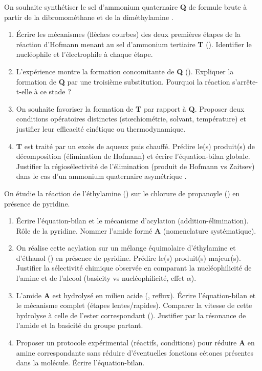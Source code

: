 \documentclass[11pt]{article}
\begin{document}
\begin{exercice}
On souhaite synthétiser le sel d'ammonium quaternaire \textbf{Q} de formule brute  à partir de la dibromométhane  et de la diméthylamine .
\begin{enumerate}
    \item Écrire les mécanismes (flèches courbes) des deux premières étapes de la réaction d'Hofmann menant au sel d'ammonium tertiaire \textbf{T} (). Identifier le nucléophile et l'électrophile à chaque étape.
    \item L'expérience montre la formation concomitante de \textbf{Q} (). Expliquer la formation de \textbf{Q} par une troisième substitution. Pourquoi la réaction s'arrête-t-elle à ce stade ?
    \item On souhaite favoriser la formation de \textbf{T} par rapport à \textbf{Q}. Proposer deux conditions opératoires distinctes (stœchiométrie, solvant, température) et justifier leur efficacité cinétique ou thermodynamique.
    \item \textbf{T} est traité par un excès de  aqueux puis chauffé. Prédire le(s) produit(s) de décomposition (élimination de Hofmann) et écrire l'équation-bilan globale. Justifier la régiosélectivité de l'élimination (produit de Hofmann vs Zaitsev) dans le cas d'un ammonium quaternaire asymétrique .
\end{enumerate}
\end{exercice}

\begin{exercice}
On étudie la réaction de l'éthylamine () sur le chlorure de propanoyle () en présence de pyridine.
\begin{enumerate}
    \item Écrire l'équation-bilan et le mécanisme d'acylation (addition-élimination). Rôle de la pyridine. Nommer l'amide formé \textbf{A} (nomenclature systématique).
    \item On réalise cette acylation sur un mélange équimolaire d'éthylamine et d'éthanol () en présence de pyridine. Prédire le(s) produit(s) majeur(s). Justifier la sélectivité chimique observée en comparant la nucléophilicité de l'amine et de l'alcool (basicity vs nucléophilicité, effet $\alpha$).
    \item L'amide \textbf{A} est hydrolysé en milieu acide (, reflux). Écrire l'équation-bilan et le mécanisme complet (étapes lentes/rapides). Comparer la vitesse de cette hydrolyse à celle de l'ester correspondant (). Justifier par la résonance de l'amide et la basicité du groupe partant.
    \item Proposer un protocole expérimental (réactifs, conditions) pour réduire \textbf{A} en amine correspondante sans réduire d'éventuelles fonctions cétones présentes dans la molécule. Écrire l'équation-bilan.
\end{enumerate}
\end{exercice}
\end{document}
